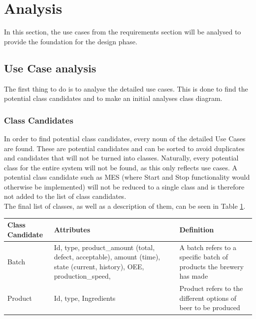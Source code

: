 \section{Analysis}
In this section, the use cases from the requirements section will be analysed
to provide the foundation for the design phase.

\subsection{Use Case analysis}
The first thing to do is to analyse the detailed use cases. This is done to find
the potential class candidates and to make an initial analyses class diagram.

\subsubsection{Class Candidates}
In order to find potential class candidates, every noun of the detailed Use
Cases are found. These are potential candidates and can be sorted to avoid
duplicates and candidates that will not be turned into classes. Naturally, every
potential class for the entire system will not be found, as this only reflects
use cases. A potential class candidate such as MES (where Start and Stop
functionality would otherwise be implemented) will not be reduced to a single
class and is therefore not added to the list of class candidates.\\

The final list of classes, as well as a description of them, can be seen in
Table \ref{table:class_candidates}.

\begin{table}[ht]
    \begin{tabularx}{\textwidth}{|>{\RaggedRight}p{4cm}|>{\RaggedRight}p{6cm}|>{\RaggedRight}X|}
    \hline
    \textbf{Class Candidate} & \textbf{Attributes}                                                                                                     & \textbf{Definition}                                                                    \\ \hline
    Batch                    & Id, type, product\_amount (total, defect, acceptable), amount (time), state (current, history), OEE, production\_speed, & A batch refers to a specific batch of products the brewery has made                    \\ \hline
    Product                  & Id, type, Ingredients                                                                                                  & Product refers to the different options of beer to be produced                         \\ \hline
    \end{tabularx}
    \label{table:class_candidates}
    \end{table}

